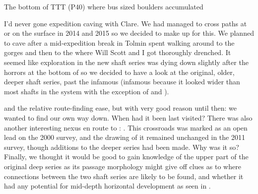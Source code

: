 \begin{marginfigure}
\caption{The bottom of TTT (P40) where bus sized boulders accumulated }
\label{Migsurf}
\end{marginfigure}

I'd never gone expedition caving with Clare. We had managed to cross paths at  or on the surface in 2014 and 2015 so we decided to make up for this. We planned to cave after a mid-expedition break in Tolmin spent walking around to the  gorges and then to the  where Will Scott and I got thoroughly drenched. It seemed like exploration in the new shaft series was dying down slightly after the horrors at the bottom of  so we decided to have a look at the original, older, deeper shaft series, past the infamous  (infamous because it looked wider than most shafts in the system with the exception of  and ).

 and the relative route-finding ease, but with very good reason until then: we wanted to find our own way down. When had it been last visited? There was also another interesting nexus en route to : . This crossroads was marked as an open lead on the 2000 survey, and the drawing of it remained unchanged in the 2011 survey, though additions to the deeper series had been made. Why was it so? Finally, we thought it would be good to gain knowledge of the upper part of the original deep series as its passage morphology might give off clues as to where connections between the two shaft series are likely to be found, and whether it had any potential for mid-depth horizontal development as seen in . 

